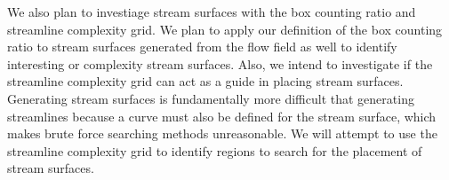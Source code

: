 \documentclass{egpubl}
\begin{document}
We also plan to investiage stream surfaces with the box counting ratio and streamline complexity grid.
We plan to apply our definition of the box counting ratio to stream surfaces generated from the flow field as well to identify interesting or complexity stream surfaces.
Also, we intend to investigate if the streamline complexity grid can act as a guide in placing stream surfaces.
Generating stream surfaces is fundamentally more difficult that generating streamlines because a curve must also be defined for the stream surface, which makes brute force searching methods unreasonable.
We will attempt to use the streamline complexity grid to identify regions to search for the placement of stream surfaces.

%


\end{document}
